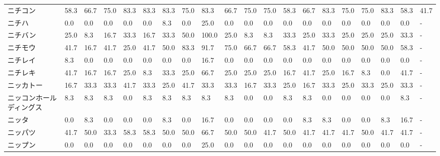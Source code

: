 \begin{tabular}{llllllllllllllllllll}
ニチコン            &   58.3 &   66.7 &      75.0 &      83.3 &       83.3 &   83.3 &   75.0 &   83.3 &    66.7 &    75.0 &   75.0 &  58.3 &   66.7 &    83.3 &    75.0 &  75.0 &  83.3 &  58.3 &  41.7 \\
ニチハ             &    0.0 &    0.0 &       0.0 &       0.0 &        0.0 &    8.3 &    0.0 &   25.0 &     0.0 &     0.0 &    0.0 &   0.0 &    0.0 &     0.0 &     0.0 &   0.0 &   0.0 &   0.0 &     - \\
ニチバン            &   25.0 &    8.3 &      16.7 &      33.3 &       16.7 &   33.3 &   50.0 &  100.0 &    25.0 &     8.3 &    8.3 &  33.3 &   25.0 &    33.3 &    25.0 &  25.0 &  25.0 &  33.3 &     - \\
ニチモウ            &   41.7 &   16.7 &      41.7 &      25.0 &       41.7 &   50.0 &   83.3 &   91.7 &    75.0 &    66.7 &   66.7 &  58.3 &   41.7 &    50.0 &    50.0 &  50.0 &  50.0 &  58.3 &     - \\
ニチレイ            &    8.3 &    0.0 &       0.0 &       0.0 &        0.0 &    0.0 &    0.0 &   16.7 &     0.0 &     0.0 &    0.0 &   0.0 &    0.0 &     0.0 &     0.0 &   0.0 &   0.0 &   0.0 &     - \\
ニチレキ            &   41.7 &   16.7 &      16.7 &      25.0 &        8.3 &   33.3 &   25.0 &   66.7 &    25.0 &    25.0 &   25.0 &  16.7 &   41.7 &    25.0 &    16.7 &   8.3 &   0.0 &  41.7 &     - \\
ニッカトー           &   16.7 &   33.3 &      33.3 &      41.7 &       33.3 &   25.0 &   41.7 &   33.3 &    33.3 &    16.7 &   33.3 &  25.0 &   16.7 &    33.3 &    25.0 &  33.3 &  25.0 &  33.3 &     - \\
ニッコンホールディングス    &    8.3 &    8.3 &       8.3 &       0.0 &        8.3 &    8.3 &    8.3 &    8.3 &     8.3 &     0.0 &    0.0 &   8.3 &    8.3 &     0.0 &     0.0 &   0.0 &   0.0 &   8.3 &     - \\
ニッタ             &    0.0 &    8.3 &       0.0 &       0.0 &        0.0 &    8.3 &    0.0 &   16.7 &     0.0 &     0.0 &    0.0 &   0.0 &    8.3 &     8.3 &     0.0 &   0.0 &   8.3 &  16.7 &     - \\
ニッパツ            &   41.7 &   50.0 &      33.3 &      58.3 &       58.3 &   50.0 &   50.0 &   66.7 &    50.0 &    50.0 &   41.7 &  50.0 &   41.7 &    41.7 &    41.7 &  50.0 &  41.7 &  41.7 &     - \\
ニップン            &    0.0 &    0.0 &       0.0 &       0.0 &        0.0 &    0.0 &    0.0 &   25.0 &     0.0 &     0.0 &    0.0 &   0.0 &    0.0 &     0.0 &     0.0 &   0.0 &   0.0 &   0.0 &     - \\

\end{tabular}
